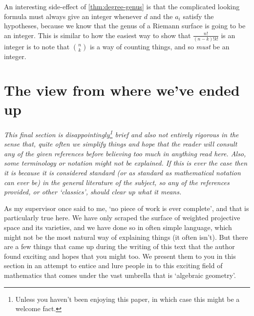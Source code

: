 \documentclass[10pt,notitlepage]{article}
\numberwithin{equation}{subsection}
\begin{document}
            An interesting side-effect of \cref{thm:degree-genus} is that the complicated looking formula must always give an integer whenever $d$ and the $a_i$ satisfy the hypotheses, because we know that the genus of a Riemann surface is going to be an integer.
            This is similar to how the easiest way to show that $\frac{n!}{(n-k)!k!}$ is an integer is to note that $\binom{n}{k}$ is a way of counting things, and so \emph{must} be an integer.
        







\section{The view from where we've ended up} %
\label{sec:the_view_from_where_we_ve_got_to}

    \emph{This final section is disappointingly\footnote{%
            Unless you haven't been enjoying this paper, in which case this might be a welcome fact.
        } brief and also not entirely rigorous in the sense that, quite often we simplify things and hope that the reader will consult any of the given references before believing too much in anything read here.
        Also, some terminology or notation might not be explained.
        If this is ever the case then it is because it is considered standard (or as standard as mathematical notation can ever be) in the general literature of the subject, so any of the references provided, or other `classics', should clear up what it means.}

    \bigskip

    As my supervisor once said to me, `no piece of work is ever complete', and that is particularly true here.
    We have only scraped the surface of weighted projective space and its varieties, and we have done so in often simple language, which might not be the most natural way of explaining things (it often isn't).
    But there are a few things that came up during the writing of this text that the author found exciting and hopes that you might too.
    We present them to you in this section in an attempt to entice and lure people in to this exciting field of mathematics that comes under the vast umbrella that is `algebraic geometry'.
\end{document}
